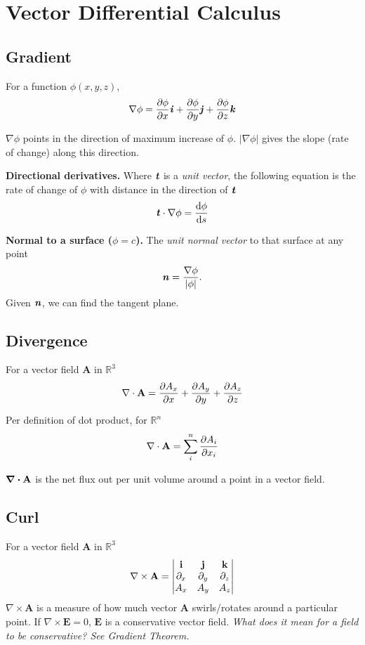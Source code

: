 \section{Vector Differential Calculus}

\subsection*{Gradient}
For a function $\phi(x, y, z)$,
\begin{equation*}
    \nabla \phi = \pdv{\phi}{x} \textbf{\textit{i}} + \pdv{\phi}{y} \textbf{\textit{j}} + \pdv{\phi}{z} \textbf{\textit{k}}
\end{equation*}

$\nabla \phi$ points in the direction of maximum increase of $\phi$. $|\nabla \phi|$ gives the slope (rate of change) along this direction.

\textbf{Directional derivatives.} Where $\textbf{\textit{t}}$ is a \textit{unit vector},
the following equation is the rate of change of $\phi$ with distance in the direction of $\textbf{\textit{t}}$
\begin{equation*}
    \textbf{\textit{t}} \cdot \nabla \phi = \dv{\phi}{s}
\end{equation*}

\textbf{Normal to a surface ($\phi = c$).} The \textit{unit normal vector} to that surface at any point
\begin{equation*}
    \textbf{\textit{n}} = \frac{\nabla \phi}{|\phi|}.
\end{equation*}
Given $\textbf{\textit{n}}$, we can find the tangent plane.
\subsection*{Divergence}
For a vector field $\mathbf{A}$ in $\mathbb{R}^3$
\begin{equation*}
    \nabla \cdot \mathbf{A} = \pdv{A_x}{x} + \smash{\pdv{A_y}{y}}+ \pdv{A_z}{z}
\end{equation*}

Per definition of dot product, for $\mathbb{R}^n$
\begin{equation*}
    \nabla \cdot \mathbf{A} = \sum_{i}^{n} \pdv{A_i}{x_i}
\end{equation*}

$\divergence \mathbf{A}$ is the net flux out per unit volume around a point in a vector field.

\subsection*{Curl}
For a vector field $\mathbf{A}$ in $\mathbb{R}^3$
\begin{equation*}
    \nabla \times \mathbf{A} = \mdet{\mathbf{i} & \mathbf{j} & \mathbf{k}\\ \partial_x & \partial_y & \partial_z \\ A_x & A_y & A_z}
\end{equation*}
$\nabla \times \mathbf{A}$ is a measure of how much vector $\mathbf{A}$ swirls/rotates around a particular point.
If $\nabla \times \mathbf{E} = 0$, $\mathbf{E}$ is a conservative vector field. \textit{What does it mean for a field to be conservative? See Gradient Theorem.}

